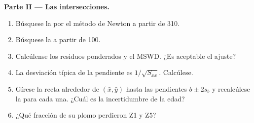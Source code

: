 \begin{problem}
\medskip\noindent\textbf{Parte II --- Las intersecciones.}
\begin{enumerate}[resume]
\item Búsquese la  por el método de Newton a partir de \qty{310}{\Ma}.
\item Búsquese la  a partir de \qty{100}{\Ma}.
\item Calcúlense los residuos ponderados y el MSWD. ¿Es aceptable el ajuste?
\item La desviación típica de la pendiente es $1/\sqrt{S_{xx}}$. Calcúlese.
\item Gírese la recta alrededor de $(\bar x, \bar y)$ hasta las pendientes $b \pm 2s_b$ y
recalcúlese la  para cada una. ¿Cuál es la incertidumbre de la edad?
\item ¿Qué fracción de su plomo perdieron Z1 y Z5?
\end{enumerate}


\end{problem}
